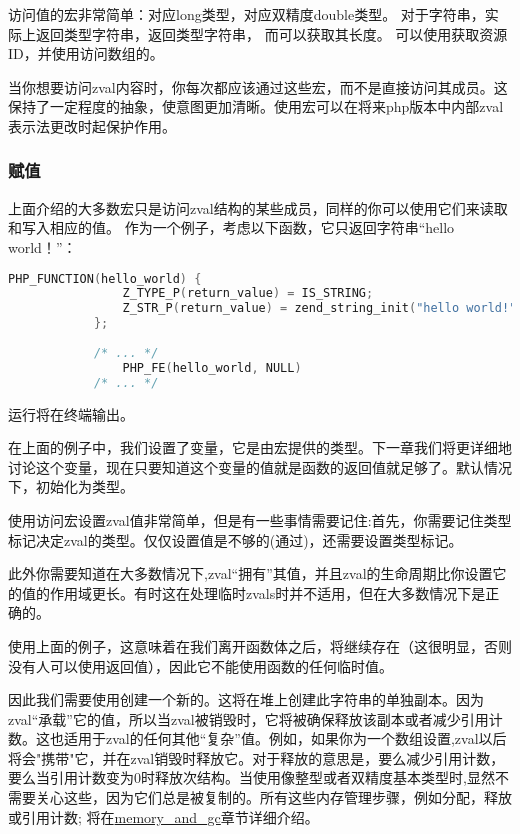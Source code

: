 访问值的宏非常简单：对应long类型，对应双精度double类型。 对于字符串，实际上返回类型字符串，返回类型字符串，
而可以获取其长度。 可以使用获取资源ID，并使用访问数组的。

当你想要访问zval内容时，你每次都应该通过这些宏，而不是直接访问其成员。这保持了一定程度的抽象，使意图更加清晰。使用宏可以在将来php版本中内部zval表示法更改时起保护作用。

\subsubsection{赋值}

上面介绍的大多数宏只是访问zval结构的某些成员，同样的你可以使用它们来读取和写入相应的值。 作为一个例子，考虑以下函数，它只返回字符串“hello world！”：

\begin{lstlisting}[language=c]
        PHP_FUNCTION(hello_world) {
                Z_TYPE_P(return_value) = IS_STRING;
                Z_STR_P(return_value) = zend_string_init("hello world!", strlen("hello world!"), 0);
            };
            
            /* ... */
                PHP_FE(hello_world, NULL)
            /* ... */        
\end{lstlisting}

运行将在终端输出。

在上面的例子中，我们设置了变量，它是由宏提供的类型。下一章我们将更详细地讨论这个变量，现在只要知道这个变量的值就是函数的返回值就足够了。默认情况下，初始化为类型。

使用访问宏设置zval值非常简单，但是有一些事情需要记住:首先，你需要记住类型标记决定zval的类型。仅仅设置值是不够的(通过)，还需要设置类型标记。

此外你需要知道在大多数情况下,zval“拥有”其值，并且zval的生命周期比你设置它的值的作用域更长。有时这在处理临时zvals时并不适用，但在大多数情况下是正确的。

使用上面的例子，这意味着在我们离开函数体之后，将继续存在（这很明显，否则没有人可以使用返回值），因此它不能使用函数的任何临时值。

因此我们需要使用创建一个新的。这将在堆上创建此字符串的单独副本。因为zval“承载”它的值，所以当zval被销毁时，它将被确保释放该副本或者减少引用计数。这也适用于zval的任何其他“复杂”值。例如，如果你为一个数组设置,zval以后将会"携带"它，并在zval销毁时释放它。对于释放的意思是，要么减少引用计数，要么当引用计数变为0时释放次结构。当使用像整型或者双精度基本类型时,显然不需要关心这些，因为它们总是被复制的。所有这些内存管理步骤，例如分配，释放或引用计数; 将在\href{http://www.phpinternalsbook.com/php7/internal_types/zvals/memory_and_gc.html}{memory\_and\_gc}章节详细介绍。

